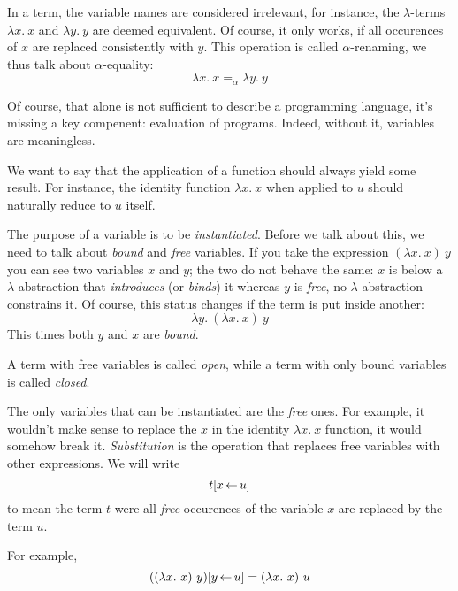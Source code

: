 In a term, the variable names are considered irrelevant, for instance, the
\(\lambda\)-terms \(\lambda x.\ x\) and \(\lambda y.\ y\) are deemed equivalent.
Of course, it only works, if all occurences of \(x\) are replaced consistently
with \(y\). This operation is called \(\alpha\)-renaming, we thus talk about
\(\alpha\)-equality:
\[
  \lambda x.\ x =_\alpha \lambda y.\ y
\]

Of course, that alone is not sufficient to describe a programming language,
it's missing a key compenent: evaluation of programs.
Indeed, without it, variables are meaningless.

We want to say that the application of a function should always yield some
result. For instance, the identity function \(\lambda x.\ x\) when applied to
\(u\) should naturally reduce to \(u\) itself.

The purpose of a variable is to be \emph{instantiated}.
Before we talk about this, we need to talk about \emph{bound} and \emph{free}
variables.
If you take the expression \((\lambda x.\ x)\ y\) you can see two variables
\(x\) and \(y\); the two do not behave the same: \(x\) is below a
\(\lambda\)-abstraction that \emph{introduces} (or \emph{binds}) it whereas
\(y\) is \emph{free}, no \(\lambda\)-abstraction constrains it.
Of course, this status changes if the term is put inside another:
\[
  \lambda y.\ (\lambda x.\ x)\ y
\]
This times both \(y\) and \(x\) are \emph{bound}.

A term with free variables is called \emph{open}, while a term with only bound
variables is called \emph{closed}.

The only variables that can be instantiated are the \emph{free} ones.
For example, it wouldn't make sense to replace the \(x\) in the identity
\(\lambda x.\ x\) function, it would somehow break it. \emph{Substitution} is
the operation that replaces free variables with other expressions.
We will write
\[
  t[x \mathop{\leftarrow} u]
\]
to mean the term \(t\) were all \emph{free} occurences of the variable \(x\)
are replaced by the term \(u\).

For example,
\[
  ((\lambda x.\ x)\ y)[y \mathop{\leftarrow} u] = (\lambda x.\ x)\ u
\]

